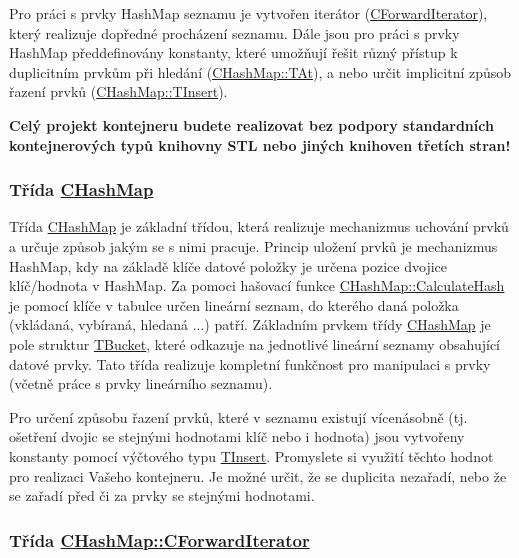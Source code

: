 Pro práci s prvky Hash\+Map seznamu je vytvořen iterátor (\hyperlink{class_c_hash_map_1_1_c_forward_iterator}{C\+Forward\+Iterator}), který realizuje dopředné procházení seznamu. Dále jsou pro práci s prvky Hash\+Map předdefinovány konstanty, které umožňují řešit různý přístup k duplicitním prvkům při hledání (\hyperlink{class_c_hash_map_a9c8b9ae56d510ae0ff5e9ba74ee9930d}{C\+Hash\+Map\+::\+T\+At}), a nebo určit implicitní způsob řazení prvků (\hyperlink{class_c_hash_map_ad4dd353df970a4464c449ef9f3b6a172}{C\+Hash\+Map\+::\+T\+Insert}).

{\bfseries Celý projekt kontejneru budete realizovat bez podpory standardních kontejnerových typů knihovny S\+TL nebo jiných knihoven třetích stran!}

\subsubsection*{Třída \hyperlink{class_c_hash_map}{C\+Hash\+Map}}

Třída \hyperlink{class_c_hash_map}{C\+Hash\+Map} je základní třídou, která realizuje mechanizmus uchování prvků a určuje způsob jakým se s nimi pracuje. Princip uložení prvků je mechanizmus Hash\+Map, kdy na základě klíče datové položky je určena pozice dvojice klíč/hodnota v Hash\+Map. Za pomoci hašovací funkce \hyperlink{class_c_hash_map_ad7230ba064063608b7e49495d3660426}{C\+Hash\+Map\+::\+Calculate\+Hash} je pomocí klíče v tabulce určen lineární seznam, do kterého daná položka (vkládaná, vybíraná, hledaná ...) patří. Základním prvkem třídy \hyperlink{class_c_hash_map}{C\+Hash\+Map} je pole struktur \hyperlink{struct_c_hash_map_1_1_t_bucket}{T\+Bucket}, které odkazuje na jednotlivé lineární seznamy obsahující datové prvky. Tato třída realizuje kompletní funkčnost pro manipulaci s prvky (včetně práce s prvky lineárního seznamu).

Pro určení způsobu řazení prvků, které v seznamu existují vícenásobně (tj. ošetření dvojic se stejnými hodnotami klíč nebo i hodnota) jsou vytvořeny konstanty pomocí výčtového typu \hyperlink{class_c_hash_map_ad4dd353df970a4464c449ef9f3b6a172}{T\+Insert}. Promyslete si využití těchto hodnot pro realizaci Vašeho kontejneru. Je možné určit, že se duplicita nezařadí, nebo že se zařadí před či za prvky se stejnými hodnotami.

\subsubsection*{Třída \hyperlink{class_c_hash_map_1_1_c_forward_iterator}{C\+Hash\+Map\+::\+C\+Forward\+Iterator}}

